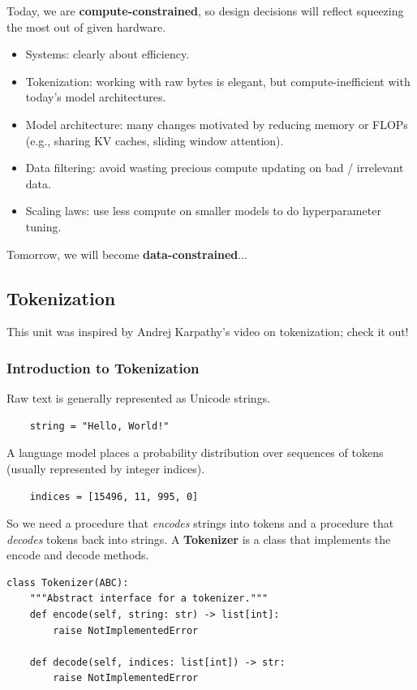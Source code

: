 \documentclass[12pt,twoside]{article}
\begin{document}
Today, we are \textbf{compute-constrained}, so design decisions will reflect squeezing the most out of given hardware.

\begin{itemize}
    \item Systems: clearly about efficiency.
    \item Tokenization: working with raw bytes is elegant, but compute-inefficient with today's model architectures.
    \item Model architecture: many changes motivated by reducing memory or FLOPs (e.g., sharing KV caches, sliding window attention).
    \item Data filtering: avoid wasting precious compute updating on bad / irrelevant data.
    \item Scaling laws: use less compute on smaller models to do hyperparameter tuning.
\end{itemize}

Tomorrow, we will become \textbf{data-constrained}...

\subsection*{Tokenization}

This unit was inspired by Andrej Karpathy's video on tokenization; check it out!

\subsubsection*{Introduction to Tokenization}

Raw text is generally represented as Unicode strings.

\begin{verbatim}
    string = "Hello, World!"
\end{verbatim}

A language model places a probability distribution over sequences of tokens (usually represented by integer indices).

\begin{verbatim}
    indices = [15496, 11, 995, 0]
\end{verbatim}

So we need a procedure that \textit{encodes} strings into tokens and a procedure that \textit{decodes} tokens back into strings. A \textbf{Tokenizer} is a class that implements the encode and decode methods.

\begin{verbatim}
class Tokenizer(ABC):
    """Abstract interface for a tokenizer."""
    def encode(self, string: str) -> list[int]:
        raise NotImplementedError
    
    def decode(self, indices: list[int]) -> str:
        raise NotImplementedError
\end{verbatim}
\end{document}
